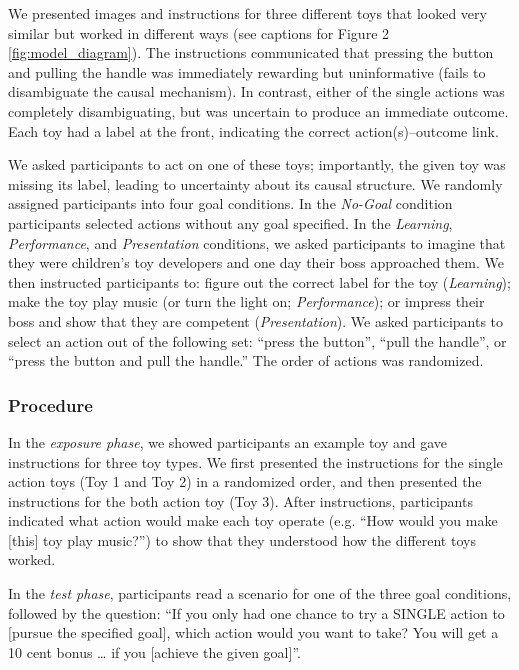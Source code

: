 \documentclass[10pt, letterpaper]{article}
\begin{document}
We presented images and instructions for three different toys that
looked very similar but worked in different ways (see captions for
Figure 2 \ref{fig:model_diagram}). The instructions communicated that
pressing the button and pulling the handle was immediately rewarding but
uninformative (fails to disambiguate the causal mechanism). In contrast,
either of the single actions was completely disambiguating, but was
uncertain to produce an immediate outcome. Each toy had a label at the
front, indicating the correct action(s)--outcome link.

We asked participants to act on one of these toys; importantly, the
given toy was missing its label, leading to uncertainty about its causal
structure. We randomly assigned participants into four goal conditions.
In the \emph{No-Goal} condition participants selected actions without
any goal specified. In the \emph{Learning}, \emph{Performance}, and
\emph{Presentation} conditions, we asked participants to imagine that
they were children's toy developers and one day their boss approached
them. We then instructed participants to: figure out the correct label
for the toy (\emph{Learning}); make the toy play music (or turn the
light on; \emph{Performance}); or impress their boss and show that they
are competent (\emph{Presentation}). We asked participants to select an
action out of the following set: ``press the button'', ``pull the
handle'', or ``press the button and pull the handle.'' The order of
actions was randomized.

\subsubsection{Procedure}\label{procedure}

In the \emph{exposure phase}, we showed participants an example toy and
gave instructions for three toy types. We first presented the
instructions for the single action toys (Toy 1 and Toy 2) in a
randomized order, and then presented the instructions for the both
action toy (Toy 3). After instructions, participants indicated what
action would make each toy operate (e.g. ``How would you make {[}this{]}
toy play music?'') to show that they understood how the different toys
worked.

In the \emph{test phase}, participants read a scenario for one of the
three goal conditions, followed by the question: ``If you only had one
chance to try a SINGLE action to {[}pursue the specified goal{]}, which
action would you want to take? You will get a 10 cent bonus \ldots{} if
you {[}achieve the given goal{]}''.
\end{document}
